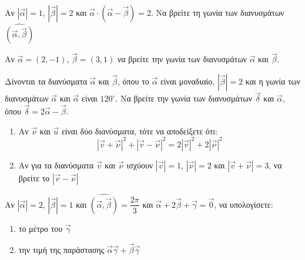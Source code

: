 \documentclass{../../presentation}
\begin{document}

\begin{askisi}
  Αν $|\vec{α}|=1$, $|\vec{β}|=2$ και $\vec{α}\cdot(\vec{α}-\vec{β})=2$. Να βρείτε τη γωνία των διανυσμάτων $\widehat{(\vec{α }, \vec{β })}$

\end{askisi}

\begin{askisi}
  Αν $\vec{α}=(2,-1)$, $\vec{β}=(3,1)$ να βρείτε την γωνία των διανυσμάτων $\vec{α}$ και $\vec{β}$.
\end{askisi}

\begin{askisi}
  Δίνονται τα διανύσματα $\vec{α}$ και $\vec{β}$, όπου το $\vec{α}$ είναι μοναδιαίο, $|\vec{β}|=2$ και η γωνία των διανυσμάτων $\vec{α}$ και $\vec{α}$ είναι $120^{\circ}$. Να βρείτε την γωνία των διανυσμάτων $\vec{δ}$ και $\vec{α}$, όπου $\vec{δ}=2\vec{α}-\vec{β}$.
\end{askisi}

\begin{askisi}
  \begin{enumerate}[<+->]
    \item     Αν $\vec{\nu}$ και $\vec{u}$ είναι δύο διανύσματα, τότε να αποδείξετε ότι:
          $$|\vec{v}+\vec{\nu}|^2+|\vec{v}-\vec{\nu}|^2=2|\vec{v}|^2+2|\vec{\nu}|^2$$
    \item    Αν για τα διανύσματα $\vec{v}$ και $\vec{\nu}$ ισχύουν $|\vec{v}|=1$, $|\vec{\nu}|=2$ και $|\vec{v}+\vec{\nu}|=3$, να βρείτε το $|\vec{v}-\vec{\nu}|$
  \end{enumerate}
\end{askisi}

\begin{askisi}
  Αν $|\vec{α}|=2$, $|\vec{β}|=1$ και $\widehat{(\vec{α }, \vec{β })}=\dfrac{2\pi}{3}$ και $\vec{α}+2\vec{β}+\vec{γ}=\vec{0}$, να υπολογίσετε:
  \begin{enumerate}
    \item<1-> το μέτρο του $\vec{γ}$
    \item<2-> την τιμή της παράστασης $\vec{α}\vec{γ}+\vec{β}\vec{γ}$
  \end{enumerate}

\end{askisi}

\end{document}

